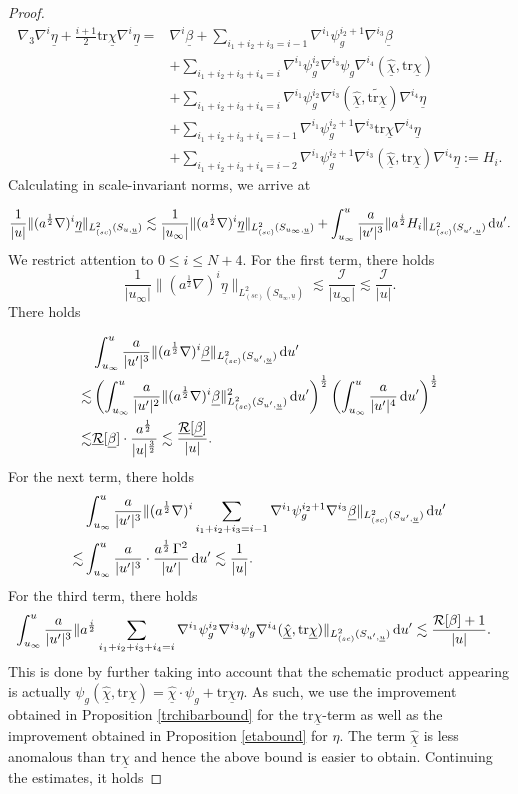 \documentclass{amsart}
\newcommand{\aln}{(\al \nabla)^i}
\newcommand{\hsp}{\hspace{.5mm}}
\newcommand{\intu}{\int_{u_{\infty}}^u}
\newcommand{\upr}{\lvert u^\prime \rvert}
\newcommand{\al}{a^{\frac{1}{2}}}
\newcommand{\chibar}{\underline{\chi}}
\newcommand{\chibarhat}{\underline{\hat{\chi}}}
\newcommand{\ubar}{\underline{u}}
\newcommand{\sumitm}{\sum_{i_1+i_2+i_3=i-1}}
\newcommand{\sumif}{\sum_{i_1+i_2+i_3+i_4=i}}
\newcommand{\sumifi}{\sum_{i_1+i_2+i_3+i_4=i-1}}
\newcommand{\sumifim}{\sum_{i_1+i_2+i_3+i_4=i-2}}
\newcommand{\be}{\begin{equation}}
\newcommand{\ee}{\end{equation}}
\newcommand{\tildetr}{\widetilde{\tr \chibar}}
\newcommand{\nablap}{\nabla^{i_1}\psi_g^{i_2}}
\newcommand{\nablapp}{\nabla^{i_1}\psi_g^{i_2+1}}
\newcommand{\scaletwoSu}[1]{\lVert{#1} \rVert_{L^2_{(sc)}(S_{u,\ubar})}}
\newcommand{\scaletwoSuprime}[1]{\lVert{#1} \rVert_{L^2_{(sc)}(S_{u^\prime,\ubar})}}
\newcommand{\betabar}{\underline{\beta}}
\newcommand{\etabar}{\underline{\eta}}
\newcommand{\duprime}{\hspace{.5mm} \text{d}u^{\prime}}
\newcommand{\nablat}{\nabla^{i_3}}
\newcommand{\nablaf}{\nabla^{i_4}}
\newcommand{\tr}{\mbox{tr}}
\begin{document}
{\begin{proof}
    \begin{align}
       \nonumber \nabla_3 \nabla^i \etabar + \frac{i+1}{2}\tr\chibar \nabla^i \etabar = &\nabla^i \betabar + \sum_{i_1+i_2+i_3=i-1} \nablapp \nablat \betabar \\ \nonumber &+\sumif \nablap \nablat \psi_g \nablaf (\chibarhat, \tr\chibar) \\ \nonumber &+ \sumif \nablap \nablat (\chibarhat, \tildetr)\nablaf \etabar \\ \nonumber &+\sumifi \nablapp \nablat \tr\chibar \nablaf \etabar \\\nonumber  &+ \sumifim \nablapp \nablat(\chibarhat,\tr\chibar)\nablaf \etabar  := H_i.
    \end{align}Calculating in scale-invariant norms, we arrive at
    
    \be \frac{1}{\lvert u \rvert}\scaletwoSu{\aln \etabar} \lesssim \frac{1}{\lvert u_{\infty} \rvert}\lVert \aln \etabar \rVert_{L^2_{(sc)}(S_{u_{\infty},\ubar})} + \intu \frac{a}{\upr^3} \scaletwoSuprime{a^{\frac{i}{2}}H_i}\duprime. \ee We restrict attention to $0\leq i \leq N+4$. For the first term, there holds
    \be \frac{1}{\lvert u_{\infty} \rvert}\lVert \aln \etabar \rVert_{L^2_{(sc)}(S_{u_{\infty},\ubar})} \lesssim \frac{\mathcal{I}}{\lvert u_{\infty}\rvert} \lesssim \frac{\mathcal{I}}{\lvert u \rvert}. \ee There holds
    
    \begin{align}
       \nonumber  &\intu \frac{a}{\upr^3}\scaletwoSuprime{\aln \betabar} \duprime  \\ \nonumber \lesssim  &\left(\intu \frac{a}{\upr^2}\scaletwoSuprime{\aln \betabar}^2 \duprime\right)^{\frac{1}{2}}\left( \intu \frac{a}{\upr^4}\duprime\right)^{\frac{1}{2}} \\   \lesssim &\underline{\mathcal{R}}[\betabar]\cdot \frac{\al}{\lvert u \rvert^{\frac{3}{2}}} \lesssim \frac{\underline{\mathcal{R}}[\betabar]}{\lvert u \rvert}.
    \end{align}For the next term, there holds   \begin{align}
       \nonumber  &\intu \frac{a}{\upr^3}\scaletwoSuprime{\aln \sumitm \nablapp \nablat \betabar} \duprime  \\\lesssim &\intu \frac{a}{\upr^3} \cdot \frac{\al \hsp \Gamma^2}{\upr}\duprime \lesssim \frac{1}{\lvert u \rvert}.
    \end{align}For the third term, there holds
     \begin{align}
     &\intu \frac{a}{\upr^3}\scaletwoSuprime{a^{\frac{i}{2}} \sumif \nablap \nablat \psi_g \nablaf (\chibarhat,\tr\chibar)} \duprime  \lesssim \frac{\mathcal{R}[\beta]+1}{\lvert u \rvert}.
    \end{align}This is done by further taking into account that the schematic product appearing is actually $\psi_g (\chibarhat, \tr\chibar) = \chibarhat \cdot \psi_g + \tr\chibar \eta$. As such, we use the improvement obtained in Proposition \ref{trchibarbound}  for the $\tr\chibar$-term as well as the improvement obtained in Proposition \ref{etabound} for $\eta$. The term $\chibarhat$ is less anomalous than $\tr\chibar$ and hence the above bound is easier to obtain. Continuing the estimates, it holds


\end{proof}}
\end{document}
